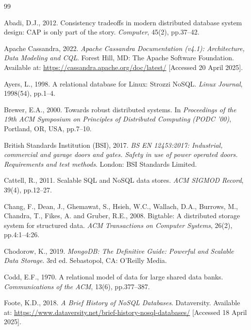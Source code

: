 \documentclass[11pt,a4paper]{article}
\begin{document}
\begin{thebibliography}{99}
\setlength{\itemsep}{6pt}
\setlength{\parskip}{0pt}

Abadi, D.J., 2012. Consistency tradeoffs in modern distributed database system design: CAP is only part of the story. \textit{Computer}, 45(2), pp.37--42.

Apache Cassandra, 2022. \textit{Apache Cassandra Documentation (v4.1): Architecture, Data Modeling and CQL}. Forest Hill, MD: The Apache Software Foundation. Available at: \url{https://cassandra.apache.org/doc/latest/} [Accessed 20 April 2025].

Ayers, L., 1998. A relational database for Linux: Strozzi NoSQL. \textit{Linux Journal}, 1998(54), pp.1--4.

Brewer, E.A., 2000. Towards robust distributed systems. In \textit{Proceedings of the 19th ACM Symposium on Principles of Distributed Computing (PODC '00)}, Portland, OR, USA, pp.7--10.

British Standards Institution (BSI), 2017. \textit{BS EN 12453:2017: Industrial, commercial and garage doors and gates. Safety in use of power operated doors. Requirements and test methods}. London: BSI Standards Limited.

Cattell, R., 2011. Scalable SQL and NoSQL data stores. \textit{ACM SIGMOD Record}, 39(4), pp.12--27.

Chang, F., Dean, J., Ghemawat, S., Hsieh, W.C., Wallach, D.A., Burrows, M., Chandra, T., Fikes, A. and Gruber, R.E., 2008. Bigtable: A distributed storage system for structured data. \textit{ACM Transactions on Computer Systems}, 26(2), pp.4:1--4:26.

Chodorow, K., 2019. \textit{MongoDB: The Definitive Guide: Powerful and Scalable Data Storage}. 3rd ed. Sebastopol, CA: O'Reilly Media.

Codd, E.F., 1970. A relational model of data for large shared data banks. \textit{Communications of the ACM}, 13(6), pp.377--387.

Foote, K.D., 2018. \textit{A Brief History of NoSQL Databases}. Dataversity. Available at: \url{https://www.dataversity.net/brief-history-nosql-databases/} [Accessed 18 April 2025].


\end{thebibliography}
\end{document}
